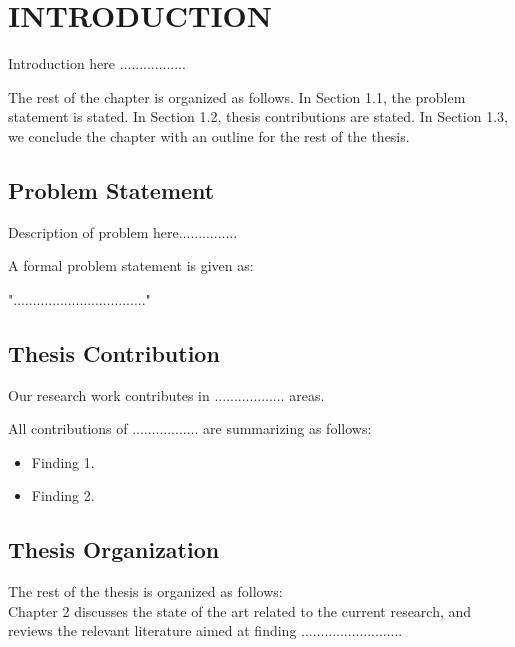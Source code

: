 \documentclass[12pt,a4paper,oneside]{book} %
\begin{document}
\listoffigures
\listoftables

%
\resetpagenumbering

\chapter{INTRODUCTION}\label{c-intro}

Introduction here .................

The rest of the chapter is organized as follows. In Section 1.1, the problem statement is stated. In Section 1.2, thesis contributions are stated. In Section 1.3, we conclude the chapter with an outline for the rest of the thesis.

\section{Problem Statement}

Description of problem here...............

A formal problem statement is given as:

".................................."

\section{Thesis Contribution}

Our research work contributes in .................. areas.

All contributions of ................. are summarizing as follows:

\begin{itemize}
\item
Finding 1.
\item
Finding 2.
\end{itemize}

\section{Thesis Organization}

The rest of the thesis is organized as follows: \\

Chapter 2 discusses the state of the art related to the current research, and reviews the relevant literature aimed at finding .......................... \\
\end{document}
